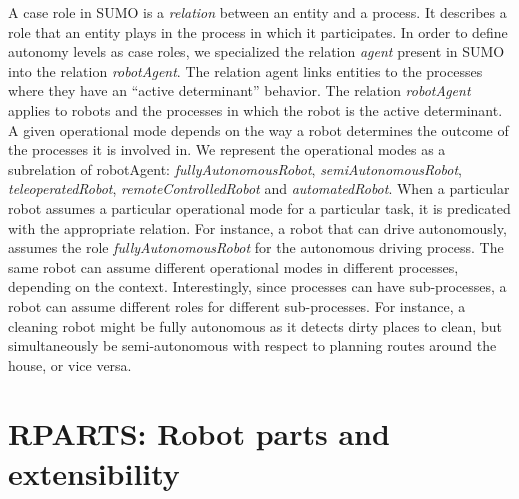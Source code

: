\documentclass[preprint,12pt]{elsarticle}
\begin{document}
A case role in SUMO is a \emph{relation} between an entity and a process. It describes a role that an entity plays in the process in which it participates. In order to define autonomy levels as case roles, we specialized the relation \emph{agent} present in SUMO into the relation \emph{robotAgent}. The relation agent links entities to the processes where they have an ``active determinant'' behavior. The relation \emph{robotAgent} applies to robots and the processes in which the robot is the active determinant. A given operational mode depends on the way a robot determines the outcome of the processes it is involved in. We represent the operational modes as a subrelation of robotAgent: \emph{fullyAutonomousRobot}, \emph{semiAutonomousRobot}, \emph{teleoperatedRobot}, \emph{remoteControlledRobot} and \emph{automatedRobot}. When a particular robot assumes a particular operational mode for a particular task, it is predicated with the appropriate relation. For instance, a robot that can drive autonomously, assumes the role \emph{fullyAutonomousRobot} for the autonomous driving process. The same robot can assume different operational modes in different processes, depending on the context. Interestingly, since processes can have sub-processes, a robot can assume different roles for different sub-processes. For instance, a cleaning robot might be fully autonomous as it detects dirty places to clean, but simultaneously be semi-autonomous with respect to planning routes around the house, or vice versa. %



\section{RPARTS: Robot parts and extensibility}





\end{document}
